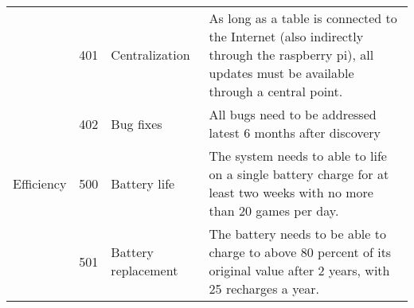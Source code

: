 \begin{table}[]
\begin{tabular}{ l l p{2.5cm} p{7.1cm}}
                        & 401 & Centralization        & As long as a table is connected to the Internet (also indirectly through the raspberry pi), all updates must be available through a central point. \\
                        & 402 & Bug fixes             & All bugs need to be addressed latest 6 months after discovery                                                                                      \\
        Efficiency      & 500 & Battery life          & The system needs to able to life on a single battery charge for at least two weeks with no more than 20 games per day.                             \\
                        & 501 & Battery replacement   & The battery needs to be able to charge to above 80 percent of its original value after 2 years, with 25 recharges a year.                         
        \end{tabular}\label{tab:nonfuncReq}
        \end{table}

